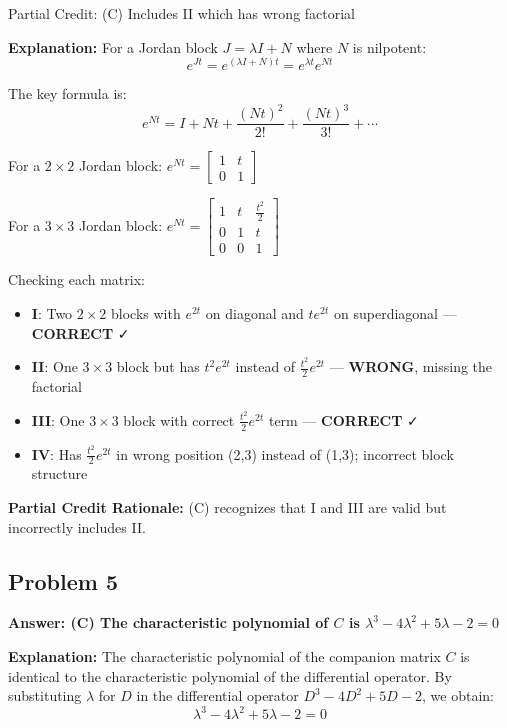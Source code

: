\documentclass[12pt]{amsart}
\newcommand{\correct}[1]{{\color{correctgreen}\textbf{#1}}}
\newcommand{\partcred}[1]{{\color{partialblue}#1}}
\begin{document}
\partcred{Partial Credit: (C) Includes II which has wrong factorial}

\textbf{Explanation:} For a Jordan block $J = \lambda I + N$ where $N$ is nilpotent:
$$e^{Jt} = e^{(\lambda I + N)t} = e^{\lambda t}e^{Nt}$$

The key formula is:
$$e^{Nt} = I + Nt + \frac{(Nt)^2}{2!} + \frac{(Nt)^3}{3!} + \cdots$$

For a $2 \times 2$ Jordan block: $e^{Nt} = \begin{bmatrix} 1 & t \\ 0 & 1 \end{bmatrix}$

For a $3 \times 3$ Jordan block: $e^{Nt} = \begin{bmatrix} 1 & t & \frac{t^2}{2} \\ 0 & 1 & t \\ 0 & 0 & 1 \end{bmatrix}$

Checking each matrix:
\begin{itemize}
\item \textbf{I}: Two $2 \times 2$ blocks with $e^{2t}$ on diagonal and $te^{2t}$ on superdiagonal — \textbf{CORRECT} ✓
\item \textbf{II}: One $3 \times 3$ block but has $t^2e^{2t}$ instead of $\frac{t^2}{2}e^{2t}$ — \textbf{WRONG}, missing the factorial
\item \textbf{III}: One $3 \times 3$ block with correct $\frac{t^2}{2}e^{2t}$ term — \textbf{CORRECT} ✓
\item \textbf{IV}: Has $\frac{t^2}{2}e^{2t}$ in wrong position (2,3) instead of (1,3); incorrect block structure
\end{itemize}

\textbf{Partial Credit Rationale:} (C) recognizes that I and III are valid but incorrectly includes II.

\subsection*{Problem 5}
\correct{Answer: (C) The characteristic polynomial of $C$ is $\lambda^3 - 4\lambda^2 + 5\lambda - 2 = 0$}

\textbf{Explanation:} The characteristic polynomial of the companion matrix $C$ is identical to the characteristic polynomial of the differential operator. By substituting $\lambda$ for $D$ in the differential operator $D^3 - 4D^2 + 5D - 2$, we obtain:
$$\lambda^3 - 4\lambda^2 + 5\lambda - 2 = 0$$
\end{document}
